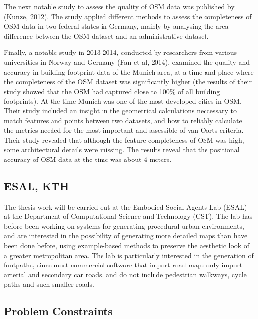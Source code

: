 \documentclass[a4paper]{article}
\begin{document}
The next notable study to assess the quality of OSM data was published by (Kunze, 2012). The study applied different methods to assess the completeness of OSM data in two federal states in Germany, mainly by analysing the area difference between the OSM dataset and an administrative dataset.

Finally, a notable study in 2013-2014, conducted by researchers from various universities in Norway and Germany (Fan et al, 2014), examined the quality and accuracy in building footprint data of the Munich area, at a time and place where the completeness of the OSM dataset was significantly higher (the results of their study showed that the OSM had captured close to 100\% of all building footprints). At the time Munich was one of the most developed cities in OSM. Their study included an insight in the geometrical calculations neccessary to match features and points between two datasets, and how to reliably calculate the metrics needed for the most important and assessible of van Oorts criteria. Their study revealed that although the feature completeness of OSM was high, some architectural details were missing. The results reveal that the positional accuracy of OSM data at the time was about 4 meters.

\subsection{ESAL, KTH}
The thesis work will be carried out at the Embodied Social Agents Lab (ESAL) at the Department of Computational Science and Technology (CST). The lab has before been working on systems for generating procedural urban environments, and are interested in the possibility of generating more detailed maps than have been done before, using example-based methods to preserve the aesthetic look of a greater metropolitan area. The lab is particularly interested in the generation of footpaths, since most commercial software that import road maps only import arterial and secondary car roads, and do not include pedestrian walkways, cycle paths and such smaller roads.

\subsection{Problem Constraints}
\end{document}

